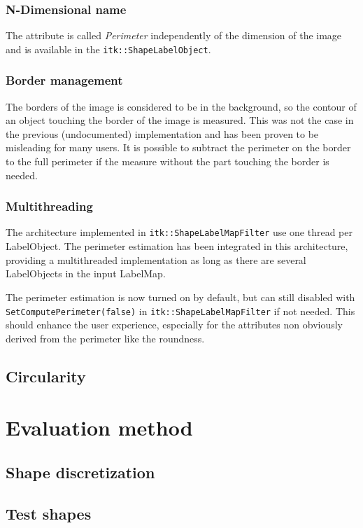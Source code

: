 \documentclass{InsightArticle}
\begin{document}
\subsubsection{N-Dimensional name}
The attribute is called {\em Perimeter} independently of the dimension of the image and is available in the \verb$itk::ShapeLabelObject$.

\subsubsection{Border management}

The borders of the image is considered to be in the background, so the contour of an object touching the border of the image is measured.
This was not the case in the previous (undocumented) implementation and has been proven to be misleading for many users.
It is possible to subtract the perimeter on the border to the full perimeter if the measure without the part touching the border is needed.

\subsubsection{Multithreading}

The architecture implemented in \verb$itk::ShapeLabelMapFilter$ use one thread per LabelObject. The perimeter estimation has been integrated in this
architecture, providing a multithreaded implementation as long as there are several LabelObjects in the input LabelMap.


The perimeter estimation is now turned on by default, but can still disabled with \verb$SetComputePerimeter(false)$ in
\verb$itk::ShapeLabelMapFilter$ if not needed. This should enhance the user experience, especially for the attributes non obviously derived
from the perimeter like the roundness.


\subsection{Circularity}


\section{Evaluation method}
\subsection{Shape discretization}
\subsection{Test shapes}
\end{document}
